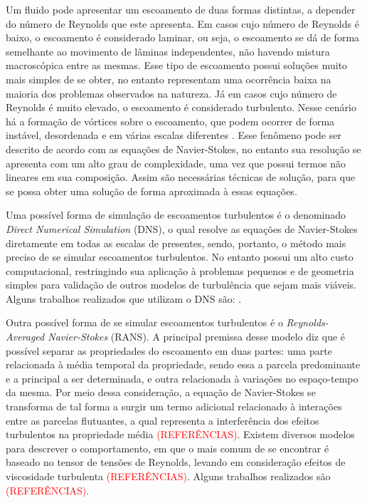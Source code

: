 \documentclass[_ArquivoPrincipal.tex]{subfiles}
\begin{document}
Um fluido pode apresentar um escoamento de duas formas distintas, a depender do número de Reynolds que este apresenta. Em casos cujo número de Reynolds é baixo, o escoamento é considerado laminar, ou seja, o escoamento se dá de forma semelhante ao movimento de lâminas independentes, não havendo mistura macroscópica entre as mesmas. Esse tipo de escoamento possui soluções muito mais simples de se obter, no entanto representam uma ocorrência baixa na maioria dos problemas observados na natureza. Já em casos cujo número de Reynolds é muito elevado, o escoamento é considerado turbulento. Nesse cenário há a formação de vórtices sobre o escoamento, que podem ocorrer de forma instável, desordenada e em várias escalas diferentes \cite{popiolek2005analise,shaughnessy2005introduction}. Esse fenômeno pode ser descrito de acordo com as equações de Navier-Stokes, no entanto sua resolução se apresenta com um alto grau de complexidade, uma vez que possui termos não lineares em sua composição. Assim são necessárias técnicas de solução, para que se possa obter uma solução de forma aproximada à essas equações.

Uma possível forma de simulação de escoamentos turbulentos é o denominado \textit{Direct Numerical Simulation} (DNS), o qual resolve as equações de Navier-Stokes diretamente em todas as escalas de presentes, sendo, portanto, o método mais preciso de se simular escoamentos turbulentos. No entanto possui um alto custo computacional, restringindo sua aplicação à problemas pequenos e de geometria simples para validação de outros modelos de turbulência que sejam mais viáveis. Alguns trabalhos realizados que utilizam o DNS são: \cite{yokokawa200216,picano2015turbulent,olad2022towards,frey2021machine}.

Outra possível forma de se simular escoamentos turbulentos é o \textit{Reynolds-Averaged Navier-Stokes} (RANS). A principal premissa desse modelo diz que é possível separar as propriedades do escoamento em duas partes: uma parte relacionada à média temporal da propriedade, sendo essa a parcela predominante e a principal a ser determinada, e outra relacionada à variações no espaço-tempo da mesma. Por meio dessa consideração, a equação de Navier-Stokes se transforma de tal forma a surgir um termo adicional relacionado à interações entre as parcelas flutuantes, a qual representa a interferência dos efeitos turbulentos na propriedade média \textcolor{red}{(REFERÊNCIAS)}. Existem diversos modelos para descrever o comportamento, em que o mais comum de se encontrar é baseado no tensor de tensões de Reynolds, levando em consideração efeitos de viscosidade turbulenta \textcolor{red}{(REFERÊNCIAS)}. Alguns trabalhos realizados são \textcolor{red}{(REFERÊNCIAS)}.
\end{document}
